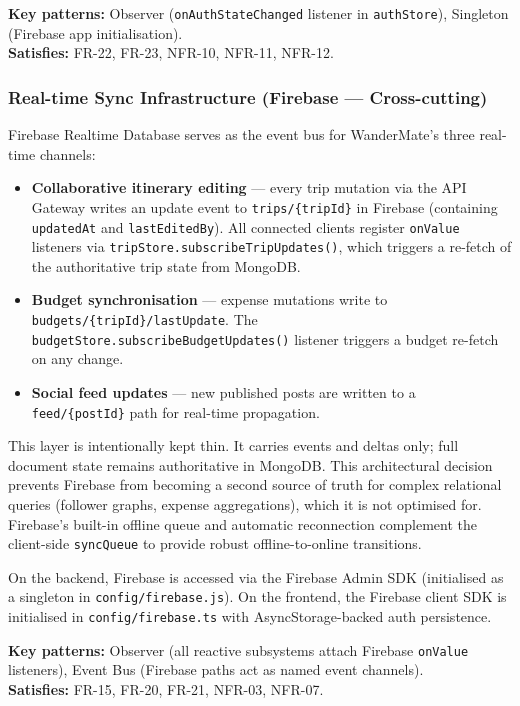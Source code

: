 \documentclass[12pt, a4paper]{article}
\begin{document}
\begin{tcolorbox}[notebox]
  \textbf{Key patterns:} Observer (\texttt{onAuthStateChanged} listener in \texttt{authStore}), Singleton (Firebase app initialisation).\\[2pt]
  \textbf{Satisfies:} FR-22, FR-23, NFR-10, NFR-11, NFR-12.
\end{tcolorbox}

\subsubsection{Real-time Sync Infrastructure (Firebase --- Cross-cutting)}

Firebase Realtime Database serves as the event bus for WanderMate's three real-time channels:
\begin{itemize}
  \item \textbf{Collaborative itinerary editing} --- every trip mutation via the API Gateway writes an update event to \texttt{trips/\{tripId\}} in Firebase (containing \texttt{updatedAt} and \texttt{lastEditedBy}). All connected clients register \texttt{onValue} listeners via \texttt{tripStore.subscribeTripUpdates()}, which triggers a re-fetch of the authoritative trip state from MongoDB.
  \item \textbf{Budget synchronisation} --- expense mutations write to \texttt{budgets/\{tripId\}/lastUpdate}. The \texttt{budgetStore.subscribeBudgetUpdates()} listener triggers a budget re-fetch on any change.
  \item \textbf{Social feed updates} --- new published posts are written to a \texttt{feed/\{postId\}} path for real-time propagation.
\end{itemize}

This layer is intentionally kept thin. It carries events and deltas only; full document state remains authoritative in MongoDB. This architectural decision prevents Firebase from becoming a second source of truth for complex relational queries (follower graphs, expense aggregations), which it is not optimised for. Firebase's built-in offline queue and automatic reconnection complement the client-side \texttt{syncQueue} to provide robust offline-to-online transitions.

On the backend, Firebase is accessed via the Firebase Admin SDK (initialised as a singleton in \texttt{config/firebase.js}). On the frontend, the Firebase client SDK is initialised in \texttt{config/firebase.ts} with AsyncStorage-backed auth persistence.

\begin{tcolorbox}[notebox]
  \textbf{Key patterns:} Observer (all reactive subsystems attach Firebase \texttt{onValue} listeners), Event Bus (Firebase paths act as named event channels).\\[2pt]
  \textbf{Satisfies:} FR-15, FR-20, FR-21, NFR-03, NFR-07.
\end{tcolorbox}
\end{document}
